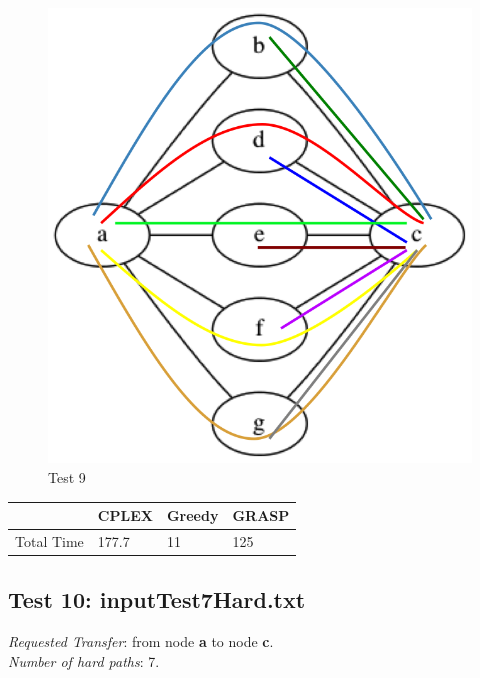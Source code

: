 \documentclass[11pt,a4paper]{article}
\begin{document}
\begin{figure}[H]
  \centering
    \includegraphics[scale=0.7]{inputTest5Hard.png}
  \caption{Test 9}
  \label{fig:test9}
\end{figure}

\begin{tabular}{| l | l | l | l |}
\hline
 & CPLEX & Greedy & GRASP \\ \hline
Total Time & 177.7 & 11 & 125 \\ \hline
\end{tabular}

\subsection{Test 10: inputTest7Hard.txt}

\textit{Requested Transfer}: from node \textbf{a} to node \textbf{c}.\\
\textit{Number of hard paths}: 7.\\
\end{document}
